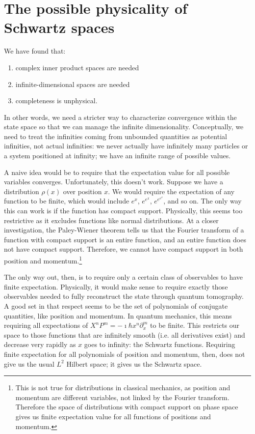 \documentclass[10pt,twocolumn, nofootinbib]{revtex4-2}
\begin{document}
\section{The possible physicality of Schwartz spaces}

We have found that:
\begin{enumerate}
\item complex inner product spaces are needed
\item infinite-dimensional spaces are needed
\item completeness is unphysical.
\end{enumerate}
In other words, we need a stricter way to characterize convergence within the state space so that we can manage the infinite dimensionality. Conceptually, we need to treat the infinities coming from unbounded quantities as potential infinities, not actual infinities: we never actually have infinitely many particles or a system positioned at infinity; we have an infinite range of possible values.

A naive idea would be to require that the expectation value for all possible variables converges. Unfortunately, this doesn't work. Suppose we have a distribution $\rho(x)$ over position $x$. We would require the expectation of any function to be finite, which would include $e^x$, $e^{e^x}$, $e^{e^{e^x}}$, and so on. The only way this can work is if the function has compact support. Physically, this seems too restrictive as it excludes functions like normal distributions. At a closer investigation, the Paley-Wiener theorem\cite{fourierCompact} tells us that the Fourier transform of a function with compact support is an entire function, and an entire function does not have compact support.\cite{markushevich2014entire} Therefore, we cannot have compact support in both position and momentum.\footnote{This is not true for distributions in classical mechanics, as position and momentum are different variables, not linked by the Fourier transform. Therefore the space of distributions with compact support on phase space gives us finite expectation value for all functions of positions and momentum.}

The only way out, then, is to require only a certain class of observables to have finite expectation. Physically, it would make sense to require exactly those observables needed to fully reconstruct the state through quantum tomography. A good set in that respect seems to be the set of polynomials of conjugate quantities, like position and momentum. In quantum mechanics, this means requiring all expectations of $X^nP^m = -\imath \hbar x^n\partial_x ^m$ to be finite. This restricts our space to those functions that are infinitely smooth (i.e. all derivatives exist) and decrease very rapidly as $x$ goes to infinity: the Schwartz functions. Requiring finite expectation for all polynomials of position and momentum, then, does not give us the usual $L^2$ Hilbert space; it gives us the Schwartz space.
\end{document}
